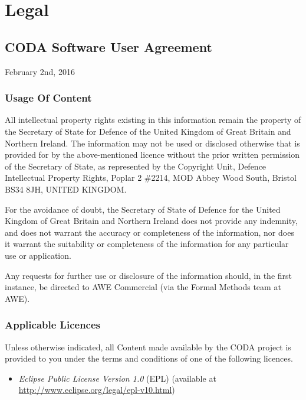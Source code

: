 \section{Legal}
\label{sec:component_diagrams-legal}

\subsection{CODA Software User Agreement}
\label{sec:component_diagrams-user-agreement}

February 2nd, 2016

\subsubsection{Usage Of Content}
\label{sec:usage-content}

All intellectual property rights existing in this information remain
the property of the Secretary of State for Defence of the United
Kingdom of Great Britain and Northern Ireland. The information may not
be used or disclosed otherwise that is provided for by the
above-mentioned licence without the prior written permission of the
Secretary of State, as represented by the Copyright Unit, Defence
Intellectual Property Rights, Poplar 2 \#2214, MOD Abbey Wood South,
Bristol BS34 8JH, UNITED KINGDOM.

For the avoidance of doubt, the Secretary of State of Defence for the
United Kingdom of Great Britain and Northern Ireland does not provide
any indemnity, and does not warrant the accuracy or completeness of
the information, nor does it warrant the suitability or completeness
of the information for any particular use or application.

Any requests for further use or disclosure of the information should,
in the first instance, be directed to AWE Commercial (via the Formal
Methods team at AWE).

\subsubsection{Applicable Licences}
\label{sec:component_diagrams-applicable-licences}

Unless otherwise indicated, all Content made available by the CODA
project is provided to you under the terms and conditions of one of
the following licences.

\begin{itemize}
\item \emph{Eclipse Public License Version 1.0} (EPL) (available at 
   \url{http://www.eclipse.org/legal/epl-v10.html})
\end{itemize}

